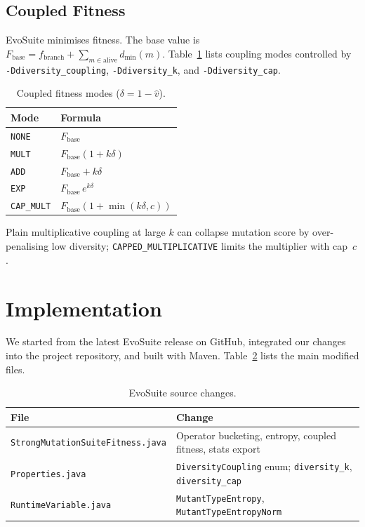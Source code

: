 \documentclass{IEEEtran}
\begin{document}
\subsection{Coupled Fitness}

EvoSuite minimises fitness. The base value is
$F_{\mathrm{base}} = f_{\mathrm{branch}} + \sum_{m \in \mathrm{alive}} d_{\min}(m)$.
Table~\ref{tab:fitness} lists coupling modes controlled by \texttt{-Ddiversity\_coupling}, \texttt{-Ddiversity\_k}, and \texttt{-Ddiversity\_cap}.

\begin{table}[htbp]
\caption{Coupled fitness modes ($\delta = 1-\hat{v}$).}
\label{tab:fitness}
\centering
\small
\begin{tabular}{@{}ll@{}}
\toprule
Mode & Formula \\
\midrule
\texttt{NONE} & $F_{\mathrm{base}}$ \\
\texttt{MULT} & $F_{\mathrm{base}}(1 + k\delta)$ \\
\texttt{ADD} & $F_{\mathrm{base}} + k\delta$ \\
\texttt{EXP} & $F_{\mathrm{base}}\, e^{k\delta}$ \\
\texttt{CAP\_MULT} & $F_{\mathrm{base}}(1 + \min(k\delta, c))$ \\
\bottomrule
\end{tabular}
\end{table}

Plain multiplicative coupling at large $k$ can collapse mutation score by over-penalising low diversity; \texttt{CAPPED\_MULTIPLICATIVE} limits the multiplier with cap~$c$.

\section{Implementation}

We started from the latest EvoSuite release on GitHub, integrated our changes into the project repository, and built with Maven.
Table~\ref{tab:files} lists the main modified files.

\begin{table}[htbp]
\caption{EvoSuite source changes.}
\label{tab:files}
\centering
\footnotesize
\begin{tabular}{@{}p{}p{}@{}}
\toprule
File & Change \\
\midrule
\texttt{StrongMutation\-SuiteFitness.java} &
Operator bucketing, entropy, coupled fitness, stats export \\
\texttt{Properties.java} &
\texttt{DiversityCoupling} enum; \texttt{diversity\_k}, \texttt{diversity\_cap} \\
\texttt{RuntimeVariable.java} &
\texttt{MutantTypeEntropy}, \texttt{MutantTypeEntropyNorm} \\
\bottomrule
\end{tabular}
\end{table}
\end{document}
